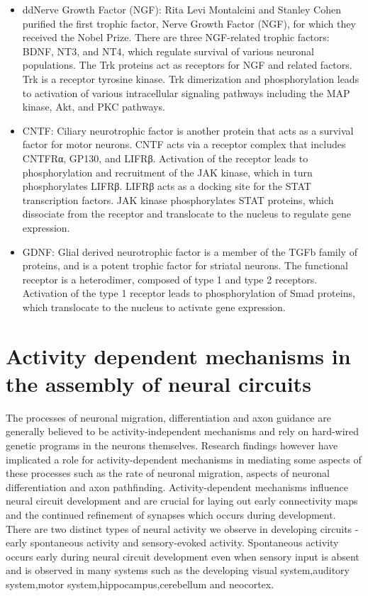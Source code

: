 \begin{itemize}
\tightlist
\item
  ddNerve Growth Factor (NGF): Rita Levi Montalcini and Stanley Cohen purified the first trophic factor, Nerve Growth Factor (NGF), for which they received the Nobel Prize. There are three NGF-related trophic factors: BDNF, NT3, and NT4, which regulate survival of various neuronal populations. The Trk proteins act as receptors for NGF and related factors. Trk is a receptor tyrosine kinase. Trk dimerization and phosphorylation leads to activation of various intracellular signaling pathways including the MAP kinase, Akt, and PKC pathways.
\item
  CNTF: Ciliary neurotrophic factor is another protein that acts as a survival factor for motor neurons. CNTF acts via a receptor complex that includes CNTFRα, GP130, and LIFRβ. Activation of the receptor leads to phosphorylation and recruitment of the JAK kinase, which in turn phosphorylates LIFRβ. LIFRβ acts as a docking site for the STAT transcription factors. JAK kinase phosphorylates STAT proteins, which dissociate from the receptor and translocate to the nucleus to regulate gene expression.
\item
  GDNF: Glial derived neurotrophic factor is a member of the TGFb family of proteins, and is a potent trophic factor for striatal neurons. The functional receptor is a heterodimer, composed of type 1 and type 2 receptors. Activation of the type 1 receptor leads to phosphorylation of Smad proteins, which translocate to the nucleus to activate gene expression.
\end{itemize}

\hypertarget{activity-dependent-mechanisms-in-the-assembly-of-neural-circuits}{%
\section{Activity dependent mechanisms in the assembly of neural circuits}\label{activity-dependent-mechanisms-in-the-assembly-of-neural-circuits}}

The processes of neuronal migration, differentiation and axon guidance are generally believed to be activity-independent mechanisms and rely on hard-wired genetic programs in the neurons themselves. Research findings however have implicated a role for activity-dependent mechanisms in mediating some aspects of these processes such as the rate of neuronal migration, aspects of neuronal differentiation and axon pathfinding. Activity-dependent mechanisms influence neural circuit development and are crucial for laying out early connectivity maps and the continued refinement of synapses which occurs during development. There are two distinct types of neural activity we observe in developing circuits -early spontaneous activity and sensory-evoked activity. Spontaneous activity occurs early during neural circuit development even when sensory input is absent and is observed in many systems such as the developing visual system,auditory system,motor system,hippocampus,cerebellum and neocortex.

